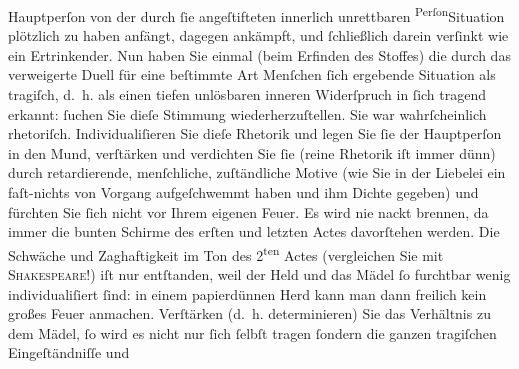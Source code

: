 \begin{ledgroupsized}[t]{13cm}
               Hauptperſon von der durch ſie angeſtifteten {\pb}innerlich unrettbaren \substVorne{}\textsuperscript{Perſon}{\allowbreak}\substDazwischen{}Situation\substHinten{} plötzlich zu haben anfängt, dagegen ankämpft, und ſchließlich darein
               verſinkt wie ein Ertrinkender. Nun haben Sie einmal (beim Erfinden des Stoffes) die durch das
               verweigerte Duell für eine beſtimmte Art Menſchen ſich ergebende Situation als
               tragiſch, d. h. als einen tiefen unlösbaren inneren Widerſpruch in ſich tragend
               erkannt: {\pb}ſuchen Sie dieſe
               Stimmung wiederherzuſtellen. Sie war wahrſcheinlich rhetoriſch. Individualiſieren Sie
               dieſe Rhetorik und legen Sie ſie der Hauptperſon in den Mund, verſtärken und
               verdichten Sie ſie (reine Rhetorik iſt immer dünn) durch retardierende, menſchliche,
               zuſtändliche Motive (wie Sie in der Liebelei ein
               faſt-nichts von Vorgang aufgeſchwemmt haben und ihm Dichte gegeben) {\pb}und fürchten Sie ſich nicht vor
               Ihrem eigenen Feuer. Es wird nie nackt brennen, da immer die bunten Schirme des
               erſten und letzten Actes davorſtehen werden. Die Schwäche und Zaghaftigkeit im Ton
               des 2\textsuperscript{ten} Actes (vergleichen Sie mit \textsc{Shakeſpeare}!) iſt nur entſtanden, weil der Held und das Mädel ſo furchtbar wenig
               individualiſiert ſind: in einem papierdünnen Herd kann man dann freilich kein großes
               Feuer anmachen. {\pb}Verſtärken \introOben{}(d. h. determinieren)\introOben{} Sie das Verhältnis zu dem Mädel, ſo wird
               es nicht nur ſich ſelbſt tragen ſondern die ganzen tragiſchen Eingeſtändniſſe und

\end{ledgroupsized}
